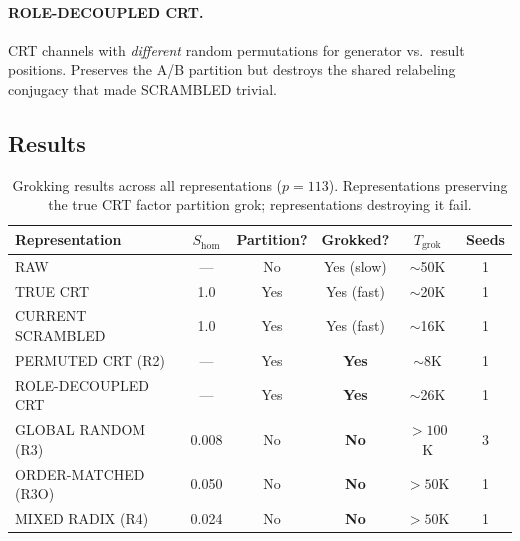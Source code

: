 \documentclass[11pt,a4paper]{article}
\theoremstyle{definition}
\theoremstyle{remark}
\newcommand{\Shom}{S_{\mathrm{hom}}}
\newcommand{\Tgrok}{T_{\mathrm{grok}}}
\begin{document}
\paragraph{ROLE-DECOUPLED CRT.} CRT channels with \emph{different} random permutations for generator vs.\ result positions. Preserves the A/B partition but destroys the shared relabeling conjugacy that made SCRAMBLED trivial.

\subsection{Results}

\begin{table}[h]
\centering
\caption{Grokking results across all representations ($p=113$). Representations preserving the true CRT factor partition grok; representations destroying it fail.}
\label{tab:grokking}
\begin{tabular}{lccccc}
\toprule
Representation & $\Shom$ & Partition? & Grokked? & $\Tgrok$ & Seeds \\
\midrule
RAW & --- & No & Yes (slow) & $\sim$50K & 1 \\
TRUE CRT & 1.0 & Yes & Yes (fast) & $\sim$20K & 1 \\
CURRENT SCRAMBLED & 1.0 & Yes & Yes (fast) & $\sim$16K & 1 \\
PERMUTED CRT (R2) & --- & Yes & \textbf{Yes} & $\sim$8K & 1 \\
ROLE-DECOUPLED CRT & --- & Yes & \textbf{Yes} & $\sim$26K & 1 \\
\midrule
GLOBAL RANDOM (R3) & 0.008 & No & \textbf{No} & $> 100$K & 3 \\
ORDER-MATCHED (R3O) & 0.050 & No & \textbf{No} & $> 50$K & 1 \\
MIXED RADIX (R4) & 0.024 & No & \textbf{No} & $> 50$K & 1 \\
\bottomrule
\end{tabular}
\end{table}
\end{document}
